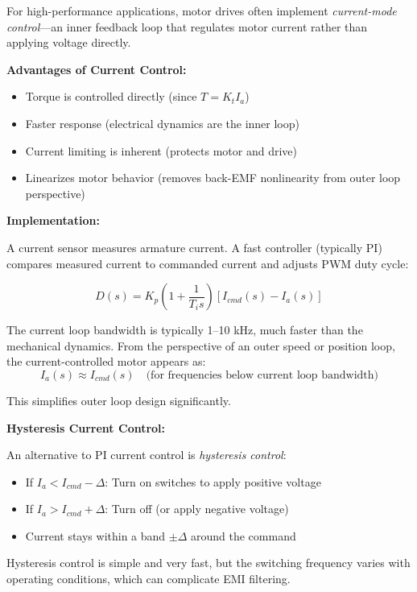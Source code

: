 For high-performance applications, motor drives often implement \textit{current-mode control}---an inner feedback loop that regulates motor current rather than applying voltage directly.

\textbf{Advantages of Current Control:}
\begin{itemize}
    \item Torque is controlled directly (since $T = K_t I_a$)
    \item Faster response (electrical dynamics are the inner loop)
    \item Current limiting is inherent (protects motor and drive)
    \item Linearizes motor behavior (removes back-EMF nonlinearity from outer loop perspective)
\end{itemize}

\textbf{Implementation:}

A current sensor measures armature current. A fast controller (typically PI) compares measured current to commanded current and adjusts PWM duty cycle:

\begin{equation}
    D(s) = K_p \left(1 + \frac{1}{T_i s}\right) [I_{cmd}(s) - I_a(s)]
\end{equation}

The current loop bandwidth is typically 1--10 kHz, much faster than the mechanical dynamics. From the perspective of an outer speed or position loop, the current-controlled motor appears as:
\begin{equation}
    I_a(s) \approx I_{cmd}(s) \quad \text{(for frequencies below current loop bandwidth)}
\end{equation}

This simplifies outer loop design significantly.

\textbf{Hysteresis Current Control:}

An alternative to PI current control is \textit{hysteresis control}:
\begin{itemize}
    \item If $I_a < I_{cmd} - \Delta$: Turn on switches to apply positive voltage
    \item If $I_a > I_{cmd} + \Delta$: Turn off (or apply negative voltage)
    \item Current stays within a band $\pm \Delta$ around the command
\end{itemize}

Hysteresis control is simple and very fast, but the switching frequency varies with operating conditions, which can complicate EMI filtering.

